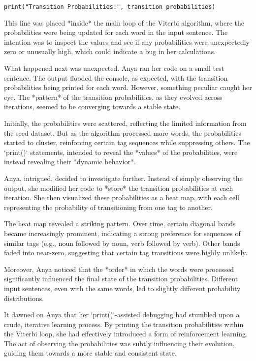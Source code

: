 \documentclass{article}
\begin{document}
{{{{\begin{verbatim}
print("Transition Probabilities:", transition_probabilities)
\end{verbatim}

This line was placed *inside* the main loop of the Viterbi algorithm, where the probabilities were being updated for each word in the input sentence. The intention was to inspect the values and see if any probabilities were unexpectedly zero or unusually high, which could indicate a bug in her calculations.

What happened next was unexpected. Anya ran her code on a small test sentence. The output flooded the console, as expected, with the transition probabilities being printed for each word. However, something peculiar caught her eye. The *pattern* of the transition probabilities, as they evolved across iterations, seemed to be converging towards a stable state.

Initially, the probabilities were scattered, reflecting the limited information from the seed dataset. But as the algorithm processed more words, the probabilities started to cluster, reinforcing certain tag sequences while suppressing others. The `print()` statements, intended to reveal the *values* of the probabilities, were instead revealing their *dynamic behavior*.

Anya, intrigued, decided to investigate further. Instead of simply observing the output, she modified her code to *store* the transition probabilities at each iteration. She then visualized these probabilities as a heat map, with each cell representing the probability of transitioning from one tag to another.

The heat map revealed a striking pattern. Over time, certain diagonal bands became increasingly prominent, indicating a strong preference for sequences of similar tags (e.g., noun followed by noun, verb followed by verb). Other bands faded into near-zero, suggesting that certain tag transitions were highly unlikely.

Moreover, Anya noticed that the *order* in which the words were processed significantly influenced the final state of the transition probabilities. Different input sentences, even with the same words, led to slightly different probability distributions.

It dawned on Anya that her `print()`-assisted debugging had stumbled upon a crude, iterative learning process. By printing the transition probabilities within the Viterbi loop, she had effectively introduced a form of reinforcement learning. The act of observing the probabilities was subtly influencing their evolution, guiding them towards a more stable and consistent state.

}}}}
\end{document}
